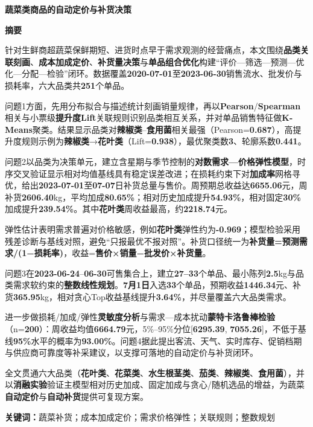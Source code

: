 \documentclass[UTF8,a4paper,12pt]{ctexart}
\begin{document}
\thispagestyle{plain}
\setcounter{page}{1}
\begin{center}
{\Large\bfseries 蔬菜类商品的自动定价与补货决策}
\end{center}
\vspace{0.4em}
\begin{center}
{\large\bfseries 摘要}
\end{center}
\vspace{0.2em}
{\small
\setlength{\parindent}{2em}
针对生鲜商超蔬菜保鲜期短、进货时点早于需求观测的经营痛点，本文围绕\textbf{品类关联刻画}、\textbf{成本加成定价}、\textbf{补货量决策}与\textbf{单品组合优化}构建“评价—筛选—预测—优化—分配—检验”闭环。数据覆盖\textbf{2020-07-01}至\textbf{2023-06-30}销售流水、批发价与损耗率，六大品类共\textbf{251}个单品。

问题1方面，先用分布拟合与描述统计刻画销量规律，再以\textbf{Pearson}/\textbf{Spearman}相关与小票级\textbf{提升度Lift}关联规则识别品类相互关系，并对单品销售特征做\textbf{K-Means}聚类。结果显示品类对\textbf{辣椒类}–\textbf{食用菌}相关最强（Pearson=\textbf{0.687}），高提升度规则示例为\textbf{辣椒类}→\textbf{花叶类}（Lift=\textbf{0.938}），最优聚类数\textbf{3}、轮廓系数\textbf{0.441}。

问题2以品类为决策单元，建立含星期与季节控制的\textbf{对数需求—价格弹性模型}，时序交叉验证显示相对均值基线具有稳定误差改进；在损耗约束下对\textbf{加成率}网格寻优，给出\textbf{2023-07-01}至\textbf{07-07}日补货总量与售价。周预期总收益达\textbf{6655.06}元，周补货\textbf{2606.40}kg，平均加成\textbf{80.65\%}；相对历史加成提升\textbf{54.93\%}，相对固定\textbf{30\%}加成提升\textbf{239.54\%}。其中\textbf{花叶类}周收益最高，约\textbf{2218.74}元。

弹性估计表明需求普遍对价格敏感，例如\textbf{花叶类}弹性约为\textbf{-0.969}；模型检验采用残差诊断与基线对照，避免“只报最优不报对照”。补货口径统一为\textbf{补货量=预测需求/(1−损耗率)}，收益=\textbf{售价×销量−批发价×补货量}。

问题3在\textbf{2023-06-24}–\textbf{06-30}可售集合上，建立\textbf{27–33}个单品、最小陈列\textbf{2.5}kg与品类需求软约束的\textbf{整数线性规划}。\textbf{7月1日}入选\textbf{33}个单品，预期收益\textbf{1446.34}元、补货\textbf{365.95}kg，相对贪心Top收益基线提升\textbf{3.64\%}，并尽量覆盖六大品类需求。

进一步做损耗/加成/弹性\textbf{灵敏度分析}与需求—成本扰动\textbf{蒙特卡洛鲁棒检验}（n=\textbf{200}）：周收益均值\textbf{6664.79}元，5\%–95\%分位[\textbf{6295.39}, \textbf{7055.26}]，不低于基线\textbf{95\%}水平的概率为\textbf{93.00\%}。问题4据此提出客流、天气、实时库存、促销档期与供应商可靠度等补采建议，以支撑可落地的自动定价与补货闭环。

全文贯通六大品类（\textbf{花叶类}、\textbf{花菜类}、\textbf{水生根茎类}、\textbf{茄类}、\textbf{辣椒类}、\textbf{食用菌}），并以\textbf{消融实验}验证主模型相对历史加成、固定加成与贪心/随机选品的增益，为蔬菜\textbf{自动定价}与\textbf{自动补货}提供可复现方案。

\vspace{0.5em}
\noindent\textbf{关键词：}蔬菜补货；成本加成定价；需求价格弹性；关联规则；整数规划
}
\end{document}
